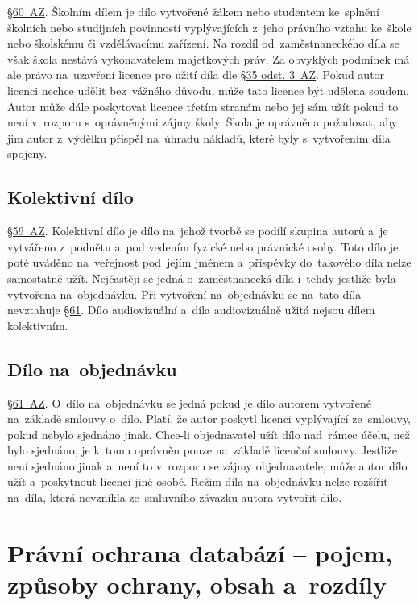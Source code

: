 \href{https://www.zakonyprolidi.cz/cs/2000-121#p60}{§60~AZ}. Školním dílem je dílo vytvořené žákem nebo studentem ke~splnění školních nebo studijních povinností vyplývajících z~jeho právního vztahu ke~škole nebo školskému či vzdělávacímu zařízení. Na rozdíl od~zaměstnaneckého díla se však škola nestává vykonavatelem majetkových práv. Za obvyklých podmínek má ale právo na~uzavření licence pro užití díla dle \href{https://www.zakonyprolidi.cz/cs/2000-121#p35-3}{§35 odst. 3~AZ}. Pokud autor licenci nechce udělit bez~vážného důvodu, může tato licence být udělena soudem. Autor může dále poskytovat licence třetím stranám nebo jej sám užít pokud to není v~rozporu s~oprávněnými zájmy školy. Škola je oprávněna požadovat, aby jim autor z~výdělku přispěl na~úhradu nákladů, které byly s~vytvořením díla spojeny.

\subsection{Kolektivní dílo}

\href{https://www.zakonyprolidi.cz/cs/2000-121#p59}{§59~AZ}. Kolektivní dílo je dílo na~jehož tvorbě se podílí skupina autorů a~je vytvářeno z~podnětu a~pod vedením fyzické nebo právnické osoby. Toto dílo je poté uváděno na~veřejnost pod~jejím jménem a~příspěvky do~takového díla nelze samostatně užít. Nejčastěji se jedná o~zaměstnanecká díla i~tehdy jestliže byla vytvořena na~objednávku. Při vytvoření na~objednávku se na~tato díla nevztahuje \href{https://www.zakonyprolidi.cz/cs/2000-121#p61}{§61}. Dílo audiovizuální a~díla audiovizuálně užitá nejsou dílem kolektivním.

\subsection{Dílo na~objednávku}

\href{https://www.zakonyprolidi.cz/cs/2000-121#p61}{§61~AZ}. O~dílo na~objednávku se jedná pokud je dílo autorem vytvořené na~základě smlouvy o~dílo. Platí, že autor poskytl licenci vyplývající ze~smlouvy, pokud nebylo sjednáno jinak. Chce-li objednavatel užít dílo nad~rámec účelu, než bylo sjednáno, je k~tomu oprávněn pouze na~základě licenční smlouvy. Jestliže není sjednáno jinak a~není to v~rozporu se zájmy objednavatele, může autor dílo užít a~poskytnout licenci jiné osobě. Režim díla na~objednávku nelze rozšířit na~díla, která nevznikla ze~smluvního závazku autora vytvořit dílo.

\clearpage
\section{Právní ochrana databází -- pojem, způsoby ochrany, obsah a~rozdíly}

